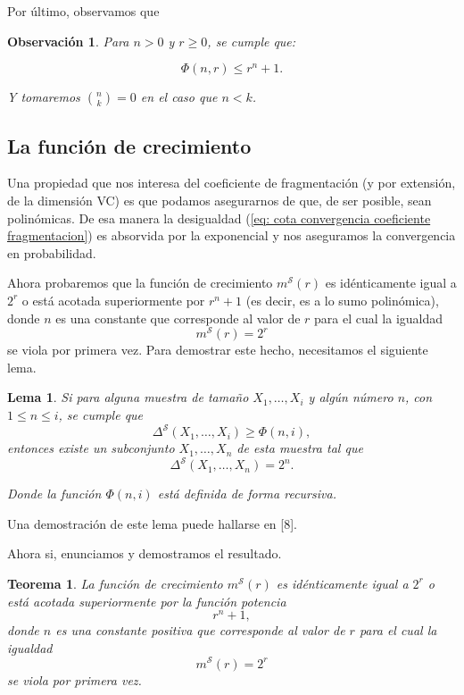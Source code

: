 \documentclass{report}
\newtheorem{thm}{Teorema}[section]
\newtheorem{lem}{Lema}[section]
\newtheorem{obs}{Observación}[section]
\begin{document}
Por último, observamos que

\begin{obs}   
Para \( n > 0 \) y \( r \geq 0 \), se cumple que:

\[
\Phi(n, r) \leq r^n + 1.
\]

Y tomaremos \( \binom{n}{k} = 0 \) en el caso que \( n < k \).\newline
\end{obs}

\subsection{La función de crecimiento}

Una propiedad que nos interesa del coeficiente de fragmentación (y por extensión, de la dimensión VC) es que podamos asegurarnos
de que, de ser posible, sean polinómicas. De esa manera la desigualdad (\ref{eq: cota convergencia coeficiente fragmentacion})
es absorvida por la exponencial y nos aseguramos la convergencia en probabilidad. \newline

Ahora probaremos que la función de crecimiento $m^{\mathcal{S}}(r)$ 
es idénticamente igual a \( 2^r \) o está acotada superiormente por \( r^n + 1 \) (es decir, es a lo sumo polinómica),  
donde \( n \) es una constante que corresponde al valor de \( r \) para el cual la igualdad  
\[
m^{\mathcal{S}}(r) = 2^r
\]
se viola por primera vez. Para demostrar este hecho, necesitamos el siguiente lema.\newline

\begin{lem}\label{Lema 1}
Si para alguna muestra de tamaño \( X_1, \dots, X_i \) y algún número \( n \), con \( 1 \leq n \leq i \),  
se cumple que  
\[
\Delta^{\mathcal{S}}(X_1, \dots, X_i) \geq \Phi(n, i),
\]  
entonces existe un subconjunto \( X_1, \dots, X_n \) de esta muestra tal que  
\[
\Delta^{\mathcal{S}}(X_1, \dots, X_n) = 2^n.
\]  

Donde la función \( \Phi(n, i) \) está definida de forma recursiva.  
\end{lem}

Una demostración de este lema puede hallarse en [8].\newline

Ahora si, enunciamos y demostramos el resultado.\newline

\begin{thm} \label{teo: cota polinomica de la función de crecimiento}
    La función de crecimiento \( m^{\mathcal{S}}(r) \) es idénticamente igual a \( 2^r \) o está acotada superiormente por la función potencia  
    \[
    r^n + 1,
    \]
    donde \( n \) es una constante positiva que corresponde al valor de \( r \) para el cual la igualdad  
    \[
    m^{\mathcal{S}}(r) = 2^r
    \]
    se viola por primera vez.    
\end{thm}
\end{document}
